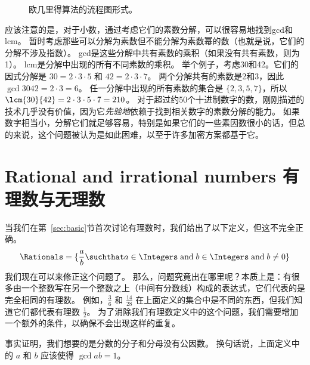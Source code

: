 \begin{figure}[!hbt]
  \begin{center}
    
  \end{center}

  \caption{欧几里得算法的流程图形式。}
  \label{fig:Euc_alg}
\end{figure}

\clearpage

应该注意的是，对于小数，通过考虑它们的素数分解，可以很容易地找到gcd和lcm。
暂时考虑那些可以分解为素数但不能分解为素数幂的数（也就是说，它们的分解不涉及指数）。
gcd是这些分解中共有素数的乘积（如果没有共有素数，则为1）。
lcm是分解中出现的所有不同素数的乘积。
举个例子，考虑30和42。它们的因式分解是 $30 = 2\cdot 3\cdot 5$ 和 $42 = 2\cdot 3 \cdot 7$。
两个分解共有的素数是2和3，因此 $\gcd{30}{42} = 2\cdot 3 = 6$。
任一分解中出现的所有素数的集合是 $\{2, 3, 5, 7 \}$，所以 $\lcm{30}{42} = 2\cdot 3\cdot 5\cdot 7 = 210$。
对于超过约50个十进制数字的数，刚刚描述的技术几乎没有价值，因为它{\em 先验地}依赖于找到相关数字的素数分解的能力。
如果数字相当小，分解它们就足够容易，特别是如果它们的一些素因数很小的话，但总的来说，这个问题被认为是如此困难，以至于许多加密方案都基于它。

\newpage




\newpage

\section{Rational and irrational numbers 有理数与无理数}
\label{sec:rat}


当我们在第~\ref{sec:basic}节首次讨论有理数时，我们给出了以下定义，但这不完全正确。
\[ \Rationals = \{ \frac{a}{b} \suchthat a \in \Integers \; \mbox{and} \;
  b \in \Integers \; \mbox{and} \; b \neq 0 \} \]
我们现在可以来修正这个问题了。
那么，问题究竟出在哪里呢？本质上是：有很多由一个整数写在另一个整数之上（中间有分数线）构成的表达式，它们代表的是完全相同的有理数。
例如，$\frac{3}{6}$ 和 $\frac{14}{28}$ 在上面定义的集合中是不同的东西，但我们知道它们都代表有理数 $\frac{1}{2}$。
为了消除我们有理数定义中的这个问题，我们需要增加一个额外的条件，以确保不会出现这样的重复。

事实证明，我们想要的是分数的分子和分母没有公因数。
换句话说，上面定义中的 $a$ 和 $b$ 应该使得 $\gcd{a}{b} = 1$。

